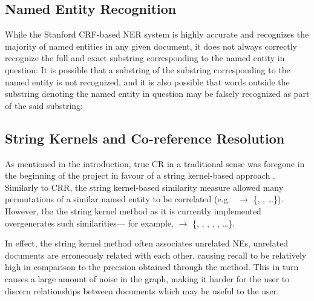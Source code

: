 
\subsection {Named Entity Recognition}
\label{sec:named_entity_recognition}
While the Stanford CRF-based NER system is highly accurate and recognizes the majority of named entities in any given document, it does not always correctly recognize the full and exact substring corresponding to the named entity in question: It is possible that a substring of the substring corresponding to the named entity is not recognized, and it is also possible that words outside the substring denoting the named entity in question may be falsely recognized as part of the said substring:



\subsection {String Kernels and Co-reference Resolution}
\label{sec:string_kernels_and_co-reference_resolution}
As mentioned in the introduction, true CR in a traditional sense was foregone in the beginning of the project in favour of a string kernel-based approach . Similarly to CRR, the string kernel-based similarity measure allowed many permutations of a similar named entity to be correlated (e.g.\ \textbf{} $\rightarrow$ \{, ,  \ldots\}). However, the the string kernel method as it is currently implemented overgenerates such similarities--- for example, \textbf{} $\rightarrow$ \{, , , , ,  \ldots\}.

In effect, the string kernel method often associates unrelated NEs, unrelated documents are erroneously related with each other, causing recall to be relatively high in comparison to the precision obtained through the method. This in turn causes a large amount of noise in the graph, making it harder for the user to discern relationships between documents which may be useful to the user.


